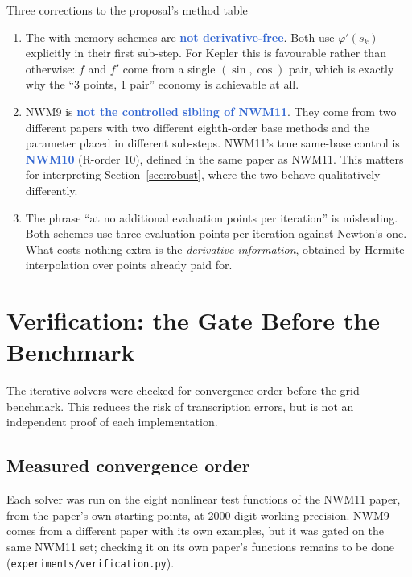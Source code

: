 \documentclass[11pt,a4paper]{article}
\newcommand{\key}[1]{\textcolor{Highlight}{\bfseries #1}}
\begin{document}
\vspace{0.5em}
\begin{notetitled}{Three corrections to the proposal's method table}
\begin{enumerate}[leftmargin=1.4em, itemsep=0.35em]
  \item The with-memory schemes are \key{not derivative-free}. Both use
        $\varphi'(s_k)$ explicitly in their first sub-step. For Kepler this
        is favourable rather than otherwise: $f$ and $f'$ come from a
        single $(\sin,\cos)$ pair, which is exactly why the ``3 points,
        1 pair'' economy is achievable at all.
  \item NWM9 is \key{not the controlled sibling of NWM11}. They come from
        two different papers with two different eighth-order base methods
        and the parameter placed in different sub-steps. NWM11's true
        same-base control is \key{NWM10} (R-order 10), defined in the same
        paper as NWM11. This matters for interpreting
        Section~\ref{sec:robust}, where the two behave qualitatively
        differently.
  \item The phrase ``at no additional evaluation points per iteration''
        is misleading. Both schemes use three evaluation points per
        iteration against Newton's one. What costs nothing extra is the
        \emph{derivative information}, obtained by Hermite interpolation
        over points already paid for.
\end{enumerate}
\end{notetitled}

\section{Verification: the Gate Before the Benchmark}
\label{sec:verify}

The iterative solvers were checked for convergence order before the grid
benchmark. This reduces the risk of transcription errors, but is not an
independent proof of each implementation.

\subsection{Measured convergence order}

Each solver was run on the eight nonlinear test functions of the NWM11
paper, from the paper's own starting points, at 2000-digit working
precision. NWM9 comes from a different paper with its own examples, but
it was gated on the same NWM11 set; checking it on its own paper's
functions remains to be done (\texttt{experiments/verification.py}).
\end{document}
